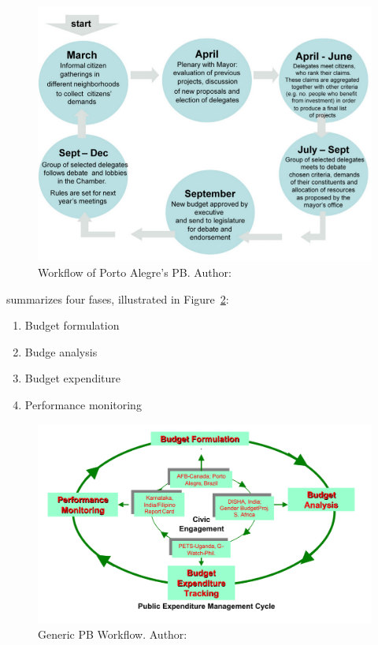 \begin{figure}[h]
\begin{center}
\includegraphics[scale=0.35]{images/portoalegreworkflow.png}
\caption{Workflow of Porto Alegre's PB. Author: \cite{Goncalves2014}\label{fig:POA}}
\end{center}
\end{figure}

\cite{TheWorldBank2001} summarizes four fases, illustrated in Figure~\ref{fig:WB}:
\begin{enumerate}
\item Budget formulation
\item Budge analysis
\item Budget expenditure
\item Performance monitoring
\end{enumerate}

\begin{figure}[h]
\begin{center}
\includegraphics[scale=0.35]{images/cycle_WB.png}
\caption{Generic PB Workflow. Author: \cite{TheWorldBank2001}\label{fig:WB}}
\end{center}
\end{figure}




